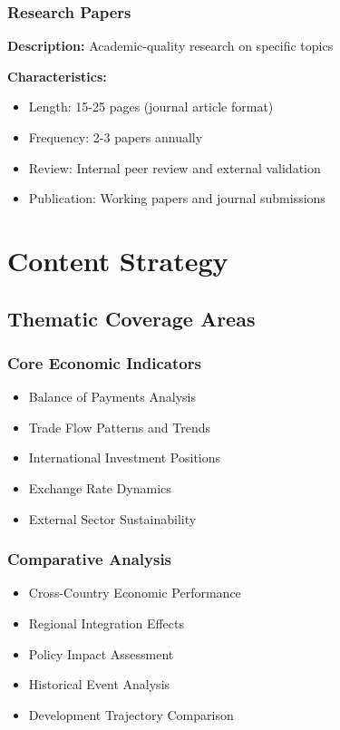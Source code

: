 \documentclass[11pt,a4paper]{article}
\begin{document}
\subsubsection{Research Papers}
\textbf{Description:} Academic-quality research on specific topics

\textbf{Characteristics:}
\begin{itemize}
    \item Length: 15-25 pages (journal article format)
    \item Frequency: 2-3 papers annually
    \item Review: Internal peer review and external validation
    \item Publication: Working papers and journal submissions
\end{itemize}

\section{Content Strategy}

\subsection{Thematic Coverage Areas}

\subsubsection{Core Economic Indicators}
\begin{itemize}
    \item Balance of Payments Analysis
    \item Trade Flow Patterns and Trends
    \item International Investment Positions
    \item Exchange Rate Dynamics
    \item External Sector Sustainability
\end{itemize}

\subsubsection{Comparative Analysis}
\begin{itemize}
    \item Cross-Country Economic Performance
    \item Regional Integration Effects
    \item Policy Impact Assessment
    \item Historical Event Analysis
    \item Development Trajectory Comparison
\end{itemize}
\end{document}
